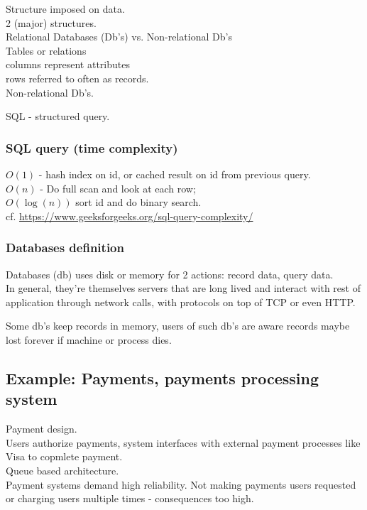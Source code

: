 \documentclass[10pt]{amsart}
\begin{document}
\begin{multicols*}{2}
Structure imposed on data. \\
2 (major) structures. \\
Relational Databases (Db's) vs. Non-relational Db's \\
Tables or relations \\
columns represent attributes \\
rows referred to often as records. \\

Non-relational Db's.

SQL - structured query.

\subsubsection{SQL query (time complexity)}

$O(1)$ - hash index on id, or cached result on id from previous query. \\
$O(n)$ - Do full scan and look at each row; \\
$O(\log{(n)})$ sort id and do binary search. \\

cf. \url{https://www.geeksforgeeks.org/sql-query-complexity/}

\subsubsection{Databases definition}

Databases (db) uses disk or memory for 2 actions: record data, query data. \\
In general, they're themselves servers that are long lived and interact with rest of application through network calls, with protocols on top of TCP or even HTTP. 

Some db's keep records in memory, users of such db's are aware records maybe lost forever if machine or process dies.


\subsection{Example: Payments, payments processing system}

Payment design. \\
Users authorize payments, system interfaces with external payment processes like Visa to copmlete payment. \\
Queue based architecture. \\
Payment systems demand high reliability. Not making payments users requested or charging users multiple times - consequences too high. 


\end{multicols*}
\end{document}
